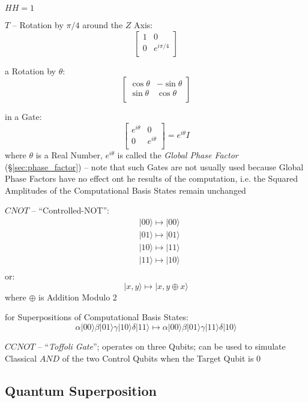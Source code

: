 $H H = 1$

$T$ -- Rotation by $\pi/4$ around the $Z$ Axis:
\[
  \begin{bmatrix}
    1 & 0 \\
    0 & e^{i\pi/4} \\
  \end{bmatrix}
\]

a Rotation by $\theta$:
\[
  \begin{bmatrix}
    \cos \theta & -\sin \theta \\
    \sin \theta &  \cos \theta \\
  \end{bmatrix}
\]

in a Gate:
\[
  \begin{bmatrix}
    e^{i\theta} & 0           \\
    0           & e^{i\theta} \\
  \end{bmatrix} = e^{i\theta}I
\]
where $\theta$ is a Real Number, $e^{i\theta}$ is called the \emph{Global Phase
  Factor} (\S\ref{sec:phase_factor}) -- note that such Gates are not usually
used because Global Phase Factors have no effect ont he results of the
computation, i.e. the Squared Amplitudes of the Computational Basis States
remain unchanged

$CNOT$ -- ``Controlled-NOT'':
\begin{align*}
  & |00\rangle \mapsto |00\rangle \\
  & |01\rangle \mapsto |01\rangle \\
  & |10\rangle \mapsto |11\rangle \\
  & |11\rangle \mapsto |10\rangle \\
\end{align*}
or:
\[
  |x,y\rangle \mapsto |x, y \oplus x\rangle
\]
where $\oplus$ is Addition Modulo $2$

for Superpositions of Computational Basis States:
\[
  \alpha|00\rangle \beta|01\rangle \gamma|10\rangle \delta|11\rangle \mapsto
  \alpha|00\rangle \beta|01\rangle \gamma|11\rangle \delta|10\rangle
\]

$CCNOT$ -- ``\emph{Toffoli Gate}''; operates on three Qubits; can be used to
simulate Classical $AND$ of the two Control Qubits when the Target Qubit is $0$



\subsection{Quantum Superposition}\label{sec:quantum_superposition}

